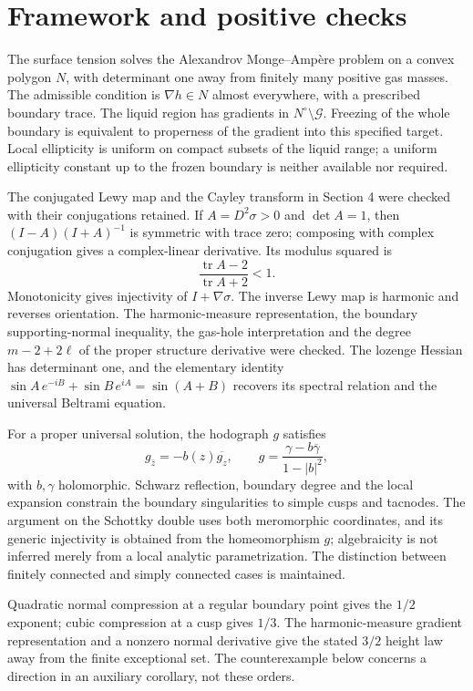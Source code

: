 \documentclass[10pt]{article}
\begin{document}
\section*{Framework and positive checks}
The surface tension solves the Alexandrov Monge–Ampère problem on a convex polygon \(N\), with determinant one away from finitely many positive gas masses. The admissible condition is \(\nabla h\in N\) almost everywhere, with a prescribed boundary trace. The liquid region has gradients in \(N^\circ\setminus\mathcal G\). Freezing of the whole boundary is equivalent to properness of the gradient into this specified target. Local ellipticity is uniform on compact subsets of the liquid range; a uniform ellipticity constant up to the frozen boundary is neither available nor required.\par
The conjugated Lewy map and the Cayley transform in Section 4 were checked with their conjugations retained. If \(A=D^2\sigma>0\) and \(\det A=1\), then \((I-A)(I+A)^{-1}\) is symmetric with trace zero; composing with complex conjugation gives a complex-linear derivative. Its modulus squared is \[\frac{\operatorname{tr}A-2}{\operatorname{tr}A+2}<1.\] Monotonicity gives injectivity of \(I+\nabla\sigma\). The inverse Lewy map is harmonic and reverses orientation. The harmonic-measure representation, the boundary supporting-normal inequality, the gas-hole interpretation and the degree \(m-2+2\ell\) of the proper structure derivative were checked. The lozenge Hessian has determinant one, and the elementary identity \(\sin A\,e^{-iB}+\sin B\,e^{iA}=\sin(A+B)\) recovers its spectral relation and the universal Beltrami equation.\par
For a proper universal solution, the hodograph \(g\) satisfies \[g_{\bar z}=-b(z)\overline{g_z},\qquad
 g=\frac{\gamma-b\overline\gamma}{1-|b|^2},\] with \(b,\gamma\) holomorphic. Schwarz reflection, boundary degree and the local expansion constrain the boundary singularities to simple cusps and tacnodes. The argument on the Schottky double uses both meromorphic coordinates, and its generic injectivity is obtained from the homeomorphism \(g\); algebraicity is not inferred merely from a local analytic parametrization. The distinction between finitely connected and simply connected cases is maintained.\par
Quadratic normal compression at a regular boundary point gives the \(1/2\) exponent; cubic compression at a cusp gives \(1/3\). The harmonic-measure gradient representation and a nonzero normal derivative give the stated \(3/2\) height law away from the finite exceptional set. The counterexample below concerns a direction in an auxiliary corollary, not these orders.\par
\end{document}
